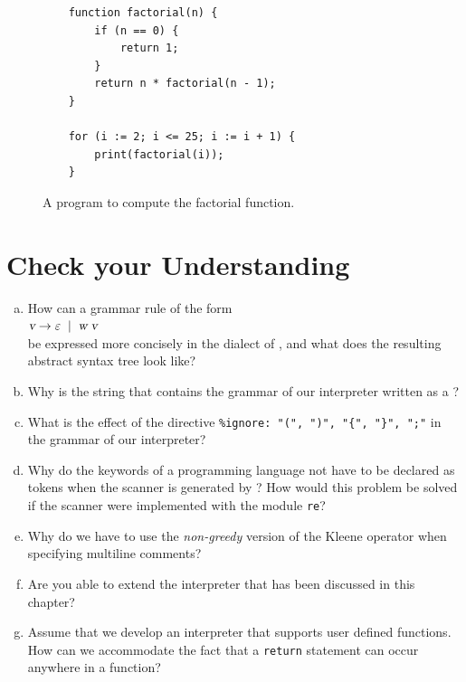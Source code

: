 \begin{figure}[!ht]
\centering
\begin{verbatim}
    function factorial(n) {
        if (n == 0) {
            return 1;
        }
        return n * factorial(n - 1);
    }
    
    for (i := 2; i <= 25; i := i + 1) {
        print(factorial(i));
    }                 
\end{verbatim}
\vspace*{-0.3cm}
\caption{A program to compute the factorial function.}
\label{fig:factorial.sl}
\end{figure}

\section{Check your Understanding}
\begin{enumerate}[(a)]
\item How can a grammar rule of the form
      \\[0.2cm]
      \hspace*{1.3cm}
      $\textsl{v} \rightarrow \varepsilon \;\mid\; \textsl{w}\; \textsl{v}$
      \\[0.2cm]
      be expressed more concisely in the  dialect of , and what does the
      resulting abstract syntax tree look like?
\item Why is the string that contains the grammar of our interpreter written as a
      ?
\item What is the effect of the directive \verb|%ignore: "(", ")", "{", "}", ";"| in the grammar of our
      interpreter?
\item Why do the keywords of a programming language not have to be declared as tokens when the scanner is
      generated by ?  How would this problem be solved if the scanner were implemented with
      the module \texttt{re}?
\item Why do we have to use the \emph{non-greedy} version of the Kleene operator when specifying multiline
      comments?
\item Are you able to extend the interpreter that has been discussed in this chapter?
\item Assume that we develop an interpreter that supports user defined functions.
      How can we accommodate the fact that a \texttt{return} statement can occur anywhere in a function?
\end{enumerate}


